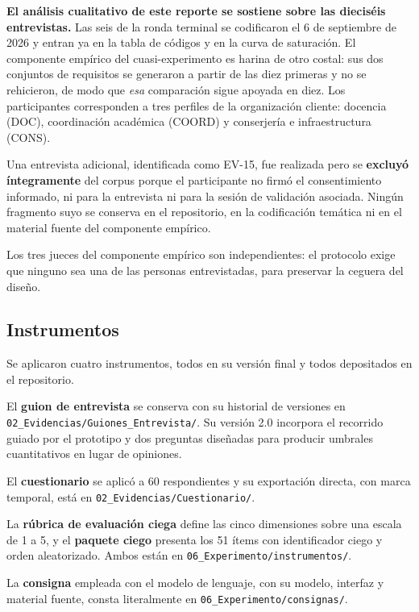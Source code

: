 \documentclass[11pt,a4paper]{article}
\begin{document}
\textbf{El an\'alisis cualitativo de este reporte se sostiene sobre las diecis\'eis
entrevistas.} Las seis de la ronda terminal se codificaron el 6 de septiembre de 2026 y
entran ya en la tabla de c\'odigos y en la curva de saturaci\'on. El componente
emp\'irico del cuasi-experimento es harina de otro costal: sus dos conjuntos de
requisitos se generaron a partir de las diez primeras y no se rehicieron, de modo que
\emph{esa} comparaci\'on sigue apoyada en diez.
Los participantes corresponden a tres perfiles de la organizaci\'on cliente: docencia
(DOC), coordinaci\'on acad\'emica (COORD) y conserjer\'ia e infraestructura (CONS).

Una entrevista adicional, identificada como EV-15, fue realizada pero se
\textbf{excluy\'o \'integramente} del corpus porque el participante no firm\'o el
consentimiento informado, ni para la entrevista ni para la sesi\'on de validaci\'on
asociada. Ning\'un fragmento suyo se conserva en el repositorio, en la codificaci\'on
tem\'atica ni en el material fuente del componente emp\'irico.

Los tres jueces del componente emp\'irico son independientes: el protocolo exige que
ninguno sea una de las personas entrevistadas, para preservar la ceguera del dise\~no.

\subsection{Instrumentos}

Se aplicaron cuatro instrumentos, todos en su versi\'on final y todos depositados en el
repositorio.

El \textbf{guion de entrevista} se conserva con su historial de versiones en
\texttt{02\_Evidencias/Guiones\_Entrevista/}. Su versi\'on 2.0 incorpora el recorrido
guiado por el prototipo y dos preguntas dise\~nadas para producir umbrales
cuantitativos en lugar de opiniones.

El \textbf{cuestionario} se aplic\'o a 60 respondientes y su exportaci\'on directa, con
marca temporal, est\'a en \texttt{02\_Evidencias/Cuestionario/}.

La \textbf{r\'ubrica de evaluaci\'on ciega} define las cinco dimensiones sobre una
escala de 1 a 5, y el \textbf{paquete ciego} presenta los 51 \'items con identificador
ciego y orden aleatorizado. Ambos est\'an en
\texttt{06\_Experimento/instrumentos/}.

La \textbf{consigna} empleada con el modelo de lenguaje, con su modelo, interfaz y
material fuente, consta literalmente en \texttt{06\_Experimento/consignas/}.
\end{document}
